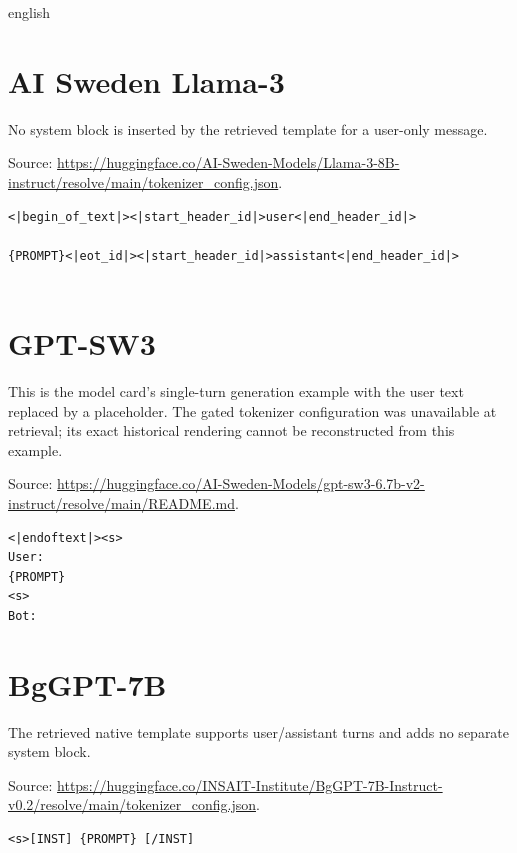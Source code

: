 \begin{otherlanguage*}{english}
\section{AI Sweden Llama-3}
No system block is inserted by the retrieved template for a user-only message.

Source: \url{https://huggingface.co/AI-Sweden-Models/Llama-3-8B-instruct/resolve/main/tokenizer_config.json}.

\begin{lstlisting}[language={},basicstyle=\ttfamily\footnotesize,breaklines=true,breakatwhitespace=false,columns=fullflexible,keepspaces=true,showstringspaces=false,numbers=none,frame=single]
<|begin_of_text|><|start_header_id|>user<|end_header_id|>

{PROMPT}<|eot_id|><|start_header_id|>assistant<|end_header_id|>


\end{lstlisting}

\section{GPT-SW3}
This is the model card's single-turn generation example with the user text replaced by a placeholder. The gated tokenizer configuration was unavailable at retrieval; its exact historical rendering cannot be reconstructed from this example.

Source: \url{https://huggingface.co/AI-Sweden-Models/gpt-sw3-6.7b-v2-instruct/resolve/main/README.md}.

\begin{lstlisting}[language={},basicstyle=\ttfamily\footnotesize,breaklines=true,breakatwhitespace=false,columns=fullflexible,keepspaces=true,showstringspaces=false,numbers=none,frame=single]
<|endoftext|><s>
User:
{PROMPT}
<s>
Bot:

\end{lstlisting}

\section{BgGPT-7B}
The retrieved native template supports user/assistant turns and adds no separate system block.

Source: \url{https://huggingface.co/INSAIT-Institute/BgGPT-7B-Instruct-v0.2/resolve/main/tokenizer_config.json}.

\begin{lstlisting}[language={},basicstyle=\ttfamily\footnotesize,breaklines=true,breakatwhitespace=false,columns=fullflexible,keepspaces=true,showstringspaces=false,numbers=none,frame=single]
<s>[INST] {PROMPT} [/INST]
\end{lstlisting}


\end{otherlanguage*}
